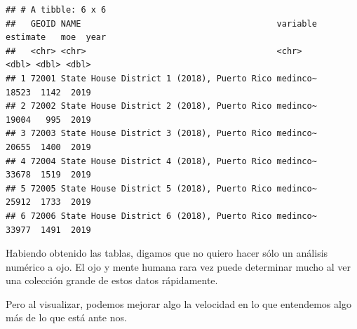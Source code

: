 \documentclass[
]{article}
\begin{document}
\begin{verbatim}
## # A tibble: 6 x 6
##   GEOID NAME                                       variable estimate   moe  year
##   <chr> <chr>                                      <chr>       <dbl> <dbl> <dbl>
## 1 72001 State House District 1 (2018), Puerto Rico medinco~    18523  1142  2019
## 2 72002 State House District 2 (2018), Puerto Rico medinco~    19004   995  2019
## 3 72003 State House District 3 (2018), Puerto Rico medinco~    20655  1400  2019
## 4 72004 State House District 4 (2018), Puerto Rico medinco~    33678  1519  2019
## 5 72005 State House District 5 (2018), Puerto Rico medinco~    25912  1733  2019
## 6 72006 State House District 6 (2018), Puerto Rico medinco~    33977  1491  2019
\end{verbatim}

Habiendo obtenido las tablas, digamos que no quiero hacer sólo un
análisis numérico a ojo. El ojo y mente humana rara vez puede determinar
mucho al ver una colección grande de estos datos rápidamente.

Pero al visualizar, podemos mejorar algo la velocidad en lo que
entendemos algo más de lo que está ante nos.
\end{document}
